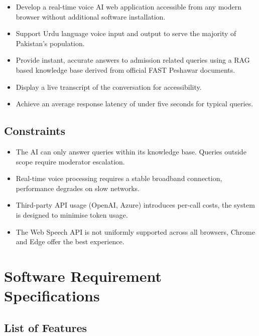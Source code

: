 \documentclass[12pt,a4paper]{report}
\begin{document}
\begin{itemize}
  \item Develop a real-time voice AI web application accessible from any
        modern browser without additional software installation.
  \item Support Urdu language voice input and output to serve the majority of
        Pakistan's population.
  \item Provide instant, accurate answers to admission related queries using
        a RAG based knowledge base derived from official FAST Peshawar documents.
  \item Display a live transcript of the conversation for accessibility.
  \item Achieve an average response latency of under five seconds for typical
        queries.
\end{itemize}

\newpage
\subsection{Constraints}

\begin{itemize}
  \item The AI can only answer queries within
        its knowledge base. Queries outside scope require moderator escalation.
  \item Real-time voice processing requires a
        stable broadband connection, performance degrades on slow networks.
  \item Third-party API usage (OpenAI, Azure) introduces
        per-call costs, the system is designed to minimise token usage.
  \item  The Web Speech API is not uniformly
        supported across all browsers, Chrome and Edge offer the best
        experience.
\end{itemize}


\newpage
\section{Software Requirement Specifications}

\subsection{List of Features}
\end{document}
